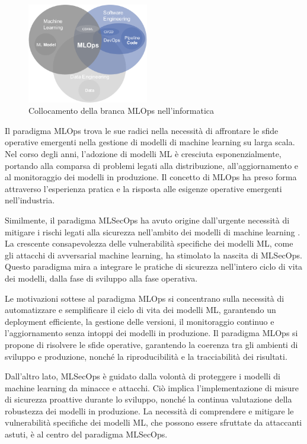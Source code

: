 \begin{figure}[h]
    \centering
    \includegraphics[width=200px]{figures/ch1/mlops-flow.png}
    \caption[Intersezione fra Machine Learning, DevOps e Data Engineering]{Collocamento della branca MLOps nell'informatica}
    \label{fig:cha1:mlops}
\end{figure}

Il paradigma MLOps \cite{mlops} trova le sue radici nella necessità di affrontare le sfide operative emergenti nella gestione di modelli di machine learning su larga scala. Nel corso degli anni, l'adozione di modelli ML è cresciuta esponenzialmente, portando alla comparsa di problemi legati alla distribuzione, all'aggiornamento e al monitoraggio dei modelli in produzione. Il concetto di MLOps ha preso forma attraverso l'esperienza pratica e la risposta alle esigenze operative emergenti nell'industria.

Similmente, il paradigma MLSecOps ha avuto origine dall'urgente necessità di mitigare i rischi legati alla sicurezza nell'ambito dei modelli di machine learning \cite{adv_ml_1}. La crescente consapevolezza delle vulnerabilità specifiche dei modelli ML, come gli attacchi di avversarial machine learning, ha stimolato la nascita di MLSecOps. Questo paradigma mira a integrare le pratiche di sicurezza nell'intero ciclo di vita dei modelli, dalla fase di sviluppo alla fase operativa.

Le motivazioni sottese al paradigma MLOps si concentrano sulla necessità di automatizzare e semplificare il ciclo di vita dei modelli ML, garantendo un deployment efficiente, la gestione delle versioni, il monitoraggio continuo e l'aggiornamento senza intoppi dei modelli in produzione. Il paradigma MLOps si propone di risolvere le sfide operative, garantendo la coerenza tra gli ambienti di sviluppo e produzione, nonché la riproducibilità e la tracciabilità dei risultati.

Dall'altro lato, MLSecOps è guidato dalla volontà di proteggere i modelli di machine learning da minacce e attacchi. Ciò implica l'implementazione di misure di sicurezza proattive durante lo sviluppo, nonché la continua valutazione della robustezza dei modelli in produzione. La necessità di comprendere e mitigare le vulnerabilità specifiche dei modelli ML, che possono essere sfruttate da attaccanti astuti, è al centro del paradigma MLSecOps.

